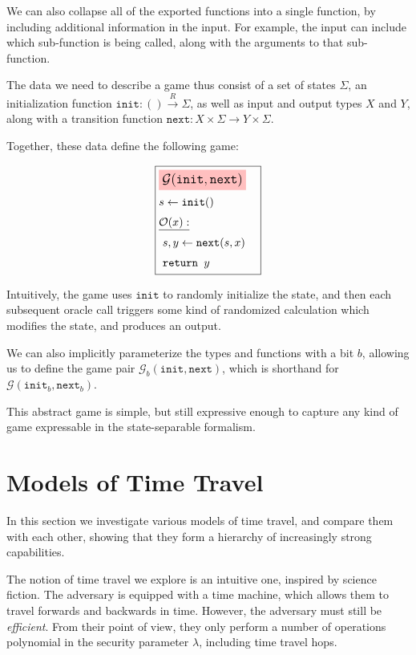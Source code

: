 We can also collapse all of the exported functions into a single function,
by including additional information in the input.
For example, the input can include which sub-function is being called,
along with the arguments to that sub-function.

The data we need to describe a game thus consist of a set of states
$\Sigma$, an initialization function $\texttt{init} : () \xrightarrow{R} \Sigma$,
as well as input and output types $X$ and $Y$, along with
a transition function ${\texttt{next} : X \times \Sigma \to Y \times \Sigma}$.

Together, these data define the following game:

\begin{game}
\captionsetup{justification=centering}
$$
\boxed{
\begin{aligned}
&\colorbox{pink}{\large $\mathcal{G}(\texttt{init}, \texttt{next})$}\cr
&s \gets \texttt{init}()\cr
&\underline{\mathcal{O}(x):}\cr
&\ s, y \gets \texttt{next}(s, x)\cr
&\ \texttt{return } y
\end{aligned}
}
$$
\caption{$\mathcal{G}(\texttt{init}, \texttt{next})$}
\end{game}

Intuitively, the game uses $\texttt{init}$ to randomly initialize the state, and
then each subsequent oracle call triggers some kind of randomized calculation
which modifies the state, and produces an output.

We can also implicitly parameterize the types and functions with a bit $b$,
allowing us to define the game pair $\mathcal{G}_b(\texttt{init}, \texttt{next})$,
which is shorthand for $\mathcal{G}(\texttt{init}_b, \texttt{next}_b)$.

This abstract game is simple, but still expressive enough to capture any
kind of game expressable in the state-separable formalism.

\section{Models of Time Travel}
\label{sec:model}

In this section we investigate various models of time travel, and compare
them with each other, showing that they form a hierarchy of increasingly
strong capabilities.

The notion of time travel we explore is an intuitive one, inspired by
science fiction.
The adversary is equipped with a time machine, which allows them
to travel forwards and backwards in time.
However, the adversary must still be \emph{efficient}.
From their point of view, they only perform a number of operations
polynomial in the security parameter $\lambda$, including time travel
hops.


